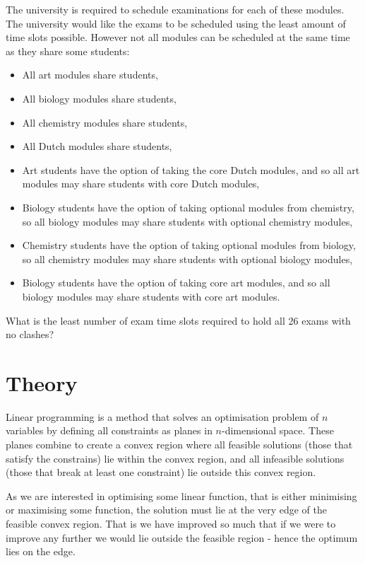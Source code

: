 The university is required to schedule examinations for each of these modules.
The university would like the exams to be scheduled using the least amount of
time slots possible. However not all modules can be scheduled at the same time
as they share some students:

\begin{itemize}
  \item All art modules share students,
  \item All biology modules share students,
  \item All chemistry modules share students,
  \item All Dutch modules share students,
  \item Art students have the option of taking the core Dutch modules, and so
  all art modules may share students with core Dutch modules,
  \item Biology students have the option of taking optional modules from
  chemistry, so all biology modules may share students with optional chemistry
  modules,
  \item Chemistry students have the option of taking optional modules from
  biology, so all chemistry modules may share students with optional biology
  modules,
  \item Biology students have the option of taking core art modules, and so all
  biology modules may share students with core art modules.
\end{itemize}

What is the least number of exam time slots required to hold all 26 exams with
no clashes?


\section{Theory}\label{sec:theory}
Linear programming is a method that solves an optimisation problem of $n$
variables by defining all constraints as planes in $n$-dimensional space. These
planes combine to create a convex region where all feasible solutions (those
that satisfy the constrains) lie within the convex region, and all infeasible
solutions (those that break at least one constraint) lie outside this convex
region.

As we are interested in optimising some linear function, that is either
minimising or maximising some function, the solution must lie at the very edge
of the feasible convex region. That is we have improved so much that if we were
to improve any further we would lie outside the feasible region - hence the
optimum lies on the edge.

